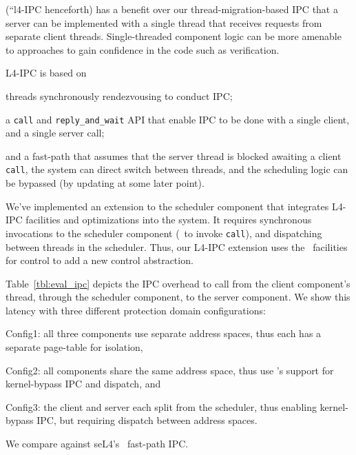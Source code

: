  (``l4-IPC henceforth) has a benefit over our thread-migration-based IPC that a server can be implemented with a single thread that receives requests from separate client threads.
Single-threaded component logic can be more amenable to approaches to gain confidence in the code such as verification.

L4-IPC is based on
\begin{inparaenum}[(1)]
\item threads synchronously rendezvousing to conduct IPC;
\item a {\tt call} and {\tt reply\_and\_wait} API that enable IPC to be done with a single client, and a single server call;
\item and a fast-path that assumes that the server thread is blocked awaiting a client {\tt call}, the system can direct switch between threads, and the scheduling logic can be bypassed (by updating at some later point).
\end{inparaenum}
We've implemented an extension to the scheduler component that integrates L4-IPC facilities and optimizations into the system.
It requires synchronous invocations to the scheduler component (\eg\ to invoke {\tt call}), and dispatching between threads in the scheduler.
Thus, our L4-IPC extension uses the \name\ facilities for control to add a new control abstraction.

Table~\ref{tbl:eval_ipc} depicts the IPC overhead to call from the client component's thread, through the scheduler component, to the server component.
We show this latency with three different protection domain configurations:
\begin{inparaenum}[(1)]
\item Config1: all three components use separate address spaces, thus each has a separate page-table for isolation,
\item Config2: all components share the same address space, thus use \name's support for kernel-bypass IPC and dispatch, and
\item Config3: the client and server each split from the scheduler, thus enabling kernel-bypass IPC, but requiring dispatch between address spaces.
\end{inparaenum}
We compare against seL4's~\cite{sel4} fast-path IPC.

